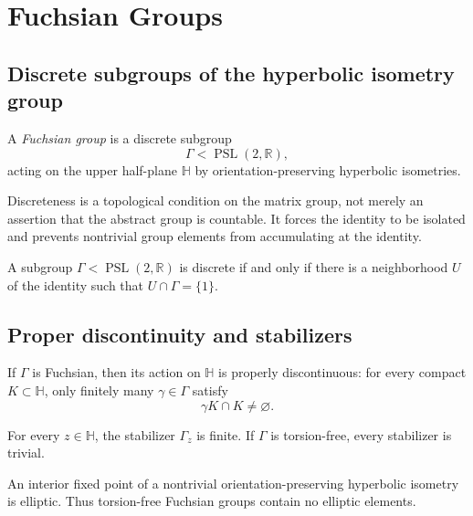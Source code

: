 \chapter{Fuchsian Groups}
\label{ch:vii35-fuchsian}

\section{Discrete subgroups of the hyperbolic isometry group}

\begin{definition}\label{def:vii35-fuchsian}
A \emph{Fuchsian group} is a discrete subgroup
\[
\Gamma<\operatorname{PSL}(2,\mathbb R),
\]
acting on the upper half-plane \(\mathbb H\) by orientation-preserving hyperbolic isometries.
\end{definition}

Discreteness is a topological condition on the matrix group, not merely an assertion that the abstract group is countable.  It forces the identity to be isolated and prevents nontrivial group elements from accumulating at the identity.

\begin{proposition}\label{prop:vii35-isolation}
A subgroup \(\Gamma<\operatorname{PSL}(2,\mathbb R)\) is discrete if and only if there is a neighborhood \(U\) of the identity such that \(U\cap\Gamma=\{1\}\).
\end{proposition}


\section{Proper discontinuity and stabilizers}

\begin{theorem}\label{thm:vii35-proper}
If \(\Gamma\) is Fuchsian, then its action on \(\mathbb H\) is properly discontinuous: for every compact \(K\subset\mathbb H\), only finitely many \(\gamma\in\Gamma\) satisfy
\[
\gamma K\cap K\ne\varnothing.
\]
\end{theorem}

\begin{corollary}\label{cor:vii35-stabilizers}
For every \(z\in\mathbb H\), the stabilizer \(\Gamma_z\) is finite.  If \(\Gamma\) is torsion-free, every stabilizer is trivial.
\end{corollary}

\begin{remark}
An interior fixed point of a nontrivial orientation-preserving hyperbolic isometry is elliptic.  Thus torsion-free Fuchsian groups contain no elliptic elements.
\end{remark}


